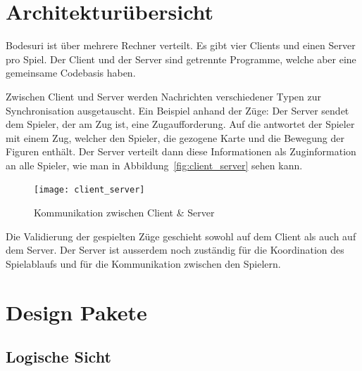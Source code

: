 \documentclass[12pt,halfparskip]{scrartcl}
\begin{document}


\section{Architekturübersicht}

Bodesuri ist über mehrere Rechner verteilt. Es gibt vier Clients und einen Server pro Spiel. Der Client und der Server sind getrennte Programme, welche aber eine gemeinsame Codebasis haben.

Zwischen Client und Server werden Nachrichten verschiedener Typen zur Synchronisation ausgetauscht. Ein Beispiel anhand der Züge: Der Server sendet dem Spieler, der am Zug ist, eine Zugaufforderung. Auf die antwortet der Spieler mit einem Zug, welcher den Spieler, die gezogene Karte und die Bewegung der Figuren enthält. Der Server verteilt dann diese Informationen als Zuginformation an alle Spieler, wie man in Abbildung~\vref{fig:client_server} sehen kann.

\begin{figure}[h]
	\centering
	\texttt{[image: client\_server]}
	\caption{Kommunikation zwischen Client \& Server}
	\label{fig:client_server}
\end{figure}

Die Validierung der gespielten Züge geschieht sowohl auf dem Client als auch auf dem Server. Der Server ist ausserdem noch zuständig für die Koordination des Spielablaufs und für die Kommunikation zwischen den Spielern.

\clearpage
\section{Design Pakete} %
\label{design_pakete}

\subsection{Logische Sicht} %
\label{sub:logische_sicht}
\end{document}
